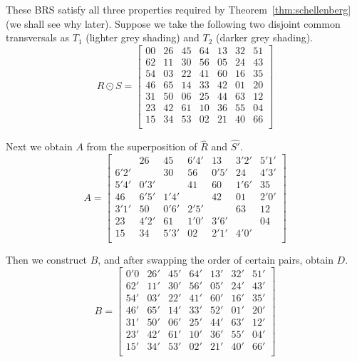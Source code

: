 \begin{example}
These BRS satisfy all three properties required by Theorem~\ref{thm:schellenberg} (we shall see why later). 
Suppose we take the following two disjoint common transversals as $T_1$ (lighter grey shading) and $T_2$ (darker grey shading).
\begin{equation}
  R \odot S = \begin{bmatrix}
      00 & 26 & 45 & 64 & 13 & 32 & 51 \\
      62 & 11 & 30 & 56 & 05 & 24 & 43 \\
      54 & 03 & 22 & 41 & 60 & 16 & 35 \\
      46 & 65 & 14 & 33 & 42 & 01 & 20 \\
      31 & 50 & 06 & 25 & 44 & 63 & 12 \\
      23 & 42 & 61 & 10 & 36 & 55 & 04 \\
      15 & 34 & 53 & 02 & 21 & 40 & 66 \\
  \end{bmatrix}
\end{equation}

Next we obtain $A$ from the superposition of $\hat{R}$ and
$\hat{S'}$.
\begin{equation}
  A = \begin{bmatrix}
           & 26   & 45   & 6'4' & 13   & 3'2' & 5'1' \\
      6'2' &      & 30   & 56   & 0'5' & 24   & 4'3' \\
      5'4' & 0'3' &      & 41   & 60   & 1'6' & 35   \\
      46   & 6'5' & 1'4' &      & 42   & 01   & 2'0' \\
      3'1' & 50   & 0'6' & 2'5' &      & 63   & 12   \\
      23   & 4'2' & 61   & 1'0' & 3'6' &      & 04   \\
      15   & 34   & 5'3' & 02   & 2'1' & 4'0' &      \\
  \end{bmatrix}
\end{equation}

Then we construct $B$, and after swapping the order of certain pairs, obtain $D$.
\begin{equation}
  B = \begin{bmatrix}
      0'0 & 26' & 45' & 64' & 13' & 32' & 51'  \\
      62' & 11' & 30' & 56' & 05' & 24' & 43'  \\
      54' & 03' & 22' & 41' & 60' & 16' & 35'  \\
      46' & 65' & 14' & 33' & 52' & 01' & 20'  \\
      31' & 50' & 06' & 25' & 44' & 63' & 12'  \\
      23' & 42' & 61' & 10' & 36' & 55' & 04'  \\
      15' & 34' & 53' & 02' & 21' & 40' & 66'  \\
  \end{bmatrix}
\end{equation}


\end{example}
